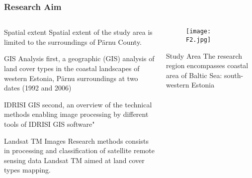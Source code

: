 \documentclass[pdflatex,compress,8pt,
	xcolor={dvipsnames,dvipsnames,svgnames,x11names,table},
	hyperref={	
	breaklinks = true, 
	pdfauthor={Lemenkova Polina}, 
	pdfsubject={Preentation}, 
	pdfcreator={Lemenkova Polina}, 
	pdfproducer={Lemenkova Polina}, 
	colorlinks=true,
	linkcolor=Tomato, 
	citecolor=DeepPink3, 
	urlcolor = NavyBlue, 
	breaklinks = true}]{beamer}
\begin{document}
\begin{frame}\frametitle{Research Aim}
\begin{minipage}[0.4\textheight]{\textwidth}
\begin{columns}[T]
\begin{column}{0.5\textwidth}
\vspace{3em}
 
\begin{alertblock}{Spatial extent}
Spatial extent of the study area is limited to the surroundings of P\"{a}rnu County.
\end{alertblock}

\begin{alertblock}{GIS Analysis}
first, a geographic (GIS) analysis of land cover types in the coastal landscapes of western Estonia, P\"{a}rnu surroundings at two dates (\alert{1992} and \alert{2006})
\end{alertblock}

\begin{block}{IDRISI GIS}
second, an overview of the technical methods enabling image processing by different tools of IDRISI GIS software"
\end{block}

\begin{block}{Landsat TM Images}
Research methods consists in processing and classification of satellite remote sensing data Landsat TM aimed at land cover types mapping.
\end{block}
\end{column}

\begin{column}{0.5\textwidth}
\vspace{3em}
\begin{figure}[H]
	\centering
		\texttt{[image: F2.jpg]}
\end{figure}

\begin{block}{Study Area}
The research region encompasses coastal area of Baltic Sea: south-western Estonia
\end{block}
\end{column}
\end{columns}
\end{minipage}
\end{frame}
\end{document}
